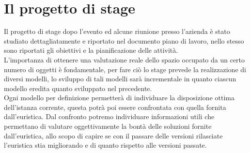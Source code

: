 \section{Il progetto di stage}
Il progetto di stage dopo l'evento  ed alcune riunione presso l'azienda è stato studiato dettagliatamente e riportato nel documento piano di lavoro, nello stesso sono riportati gli obiettivi e la pianificazione delle attività.\\
L'importanza di ottenere una valutazione reale dello spazio occupato da un certo numero di oggetti è fondamentale, per fare ciò lo stage prevede la realizzazione di diversi modelli, lo sviluppo di tali modelli sarà incrementale in quanto ciascun modello eredita quanto sviluppato nel precedente.\\
Ogni modello per definizione permetterà di individuare la disposizione ottima dell'istanza corrente, questa potrà poi essere confrontata con quella fornita dall'euristica. Dal confronto potremo individuare informazioni utili che permettano di valutare oggettivamente la bontà delle soluzioni fornite dall'euristica, allo scopo di capire se con il passare delle versioni rilasciate l'euristica stia migliorando e di quanto rispetto alle versioni passate.

